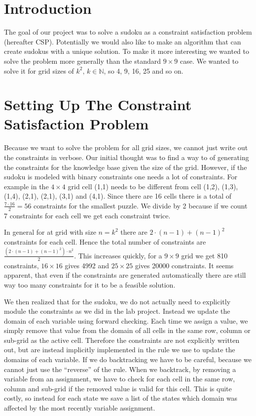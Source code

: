 \documentclass[12pt, a4paper, titlepage]{article}
\begin{document}

\maketitlepage

\section*{Introduction}
The goal of our project was to solve a sudoku as a constraint satisfaction problem (hereafter CSP). Potentially we would also like to make an algorithm that can create sudokus with a unique solution. To make it more interesting we wanted to solve the problem more generally than the standard $9 \times 9$ case. We wanted to solve it for grid sizes of $k^2, \, k \in \mathbb{N}$, so 4, 9, 16, 25 and so on. 

\section*{Setting Up The Constraint Satisfaction Problem}
Because we want to solve the problem for all grid sizes, we cannot just write out the constraints in verbose. Our initial thought was to find a way to of generating the constraints for the knowledge base given the size of the grid. However, if the sudoku is modeled with binary constraints one needs a lot of constraints. For example in the $4 \times 4$ grid cell (1,1) needs to be different from cell (1,2), (1,3), (1,4), (2,1), (2,1), (3,1) and (4,1). Since there are 16 cells there is a total of $\frac{7\cdot 16}{2} = 56$ constraints for the smallest puzzle. We divide by 2 because if we count 7 constraints for each cell we get each constraint twice. 

In general for at grid with size $n=k^2$ there are $2 \cdot (n-1) + (n-1)^2$ constraints for each cell. Hence the total number of constraints are $\frac{(2 \cdot (n-1) + (n-1)^2) \cdot n^2}{2}$. This increases quickly, for a $9 \times 9$ grid we get 810 constraints, $16 \times 16$ gives 4992 and $25 \times 25$ gives 20000 constraints. It seems apparent, that even if the constraints are generated automatically there are still way too many constraints for it to be a feasible solution.  

We then realized that for the sudoku, we do not actually need to explicitly module the constraints as we did in the lab project. Instead we update the domain of each variable using forward checking. Each time we assign a value, we simply remove that value from the domain of all cells in the same row, column or sub-grid as the active cell. Therefore the constraints are not explicitly written out, but are instead implicitly implemented in the rule we use to update the domains of each variable. If we do backtracking we have to be careful, because we cannot just use the ``reverse'' of the rule. When we backtrack, by removing a variable from an assignment, we have to check for each cell in the same row, column and sub-grid if the removed value is valid for this cell. This is quite costly, so instead for each state we save a list of the states which domain was affected by the most recently variable assignment. 
\end{document}
